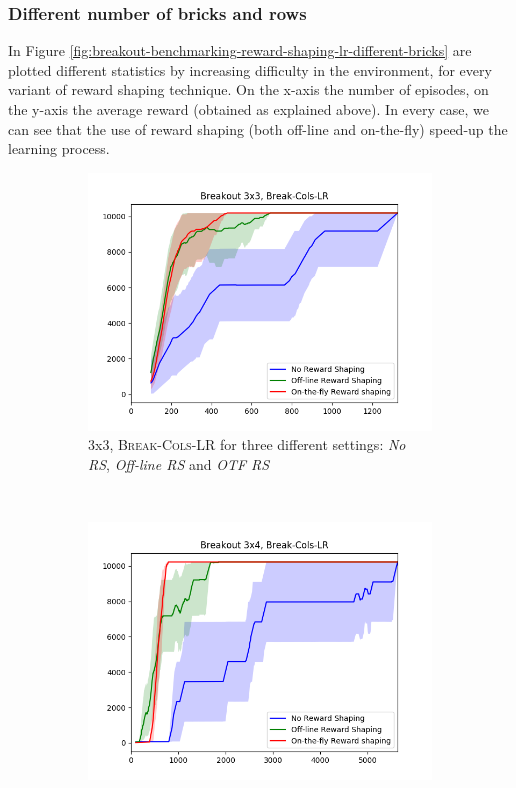 \subsubsection{Different number of bricks and rows}
In Figure \ref{fig:breakout-benchmarking-reward-shaping-lr-different-bricks} are plotted different statistics by increasing difficulty in the environment, for every variant of reward shaping technique.
On the x-axis the number of episodes, on the y-axis the average reward (obtained as explained above). In every case, we can see that the use of reward shaping (both off-line and on-the-fly) speed-up the learning process.
\begin{figure}[h]
	 \centering
	 \begin{subfigure}[b]{0.57\textwidth}
	\includegraphics[width=\textwidth]{images/rs-comparison_b33.png}
	 	\caption{\Breakout 3x3, \textsc{Break-Cols-LR} for three different settings: \emph{No RS}, \emph{Off-line RS} and \emph{OTF RS}}
	 	\label{fig:breakout-benchmarking-reward-shaping-33-lr}
	 \end{subfigure}
	 ~ %
	 \begin{subfigure}[b]{0.57\textwidth}
		\includegraphics[width=\textwidth]{images/rs-comparison_b34.png}

\end{subfigure}
\end{figure}
